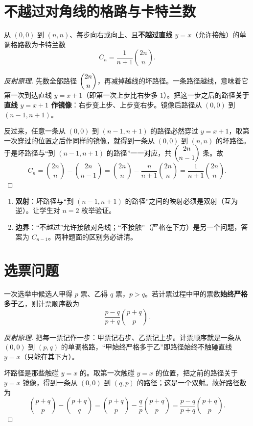 \section{不越过对角线的格路与卡特兰数}
\begin{theorem}[不越过对角线的格路]
从 $(0,0)$ 到 $(n,n)$、每步向右或向上、且\textbf{不越过直线 $y=x$}（允许接触）的单调格路数为卡特兰数
\[
C_n=\frac1{n+1}\binom{2n}{n}.
\]
\end{theorem}
\begin{proof}[反射原理]
先数全部路径 $\dbinom{2n}{n}$，再减掉越线的坏路径。一条路径越线，意味着它第一次到达直线 $y=x+1$（即第一次上步比右步多 $1$）。把这一步之后的路径\textbf{关于直线 $y=x+1$ 作镜像}：右步变上步、上步变右步。镜像后路径从 $(0,0)$ 到 $(n-1,n+1)$。

反过来，任意一条从 $(0,0)$ 到 $(n-1,n+1)$ 的路径必然穿过 $y=x+1$，取第一次穿过的位置之后作同样的镜像，就得到一条从 $(0,0)$ 到 $(n,n)$ 的坏路径。于是坏路径与“到 $(n-1,n+1)$ 的路径”一一对应，共 $\dbinom{2n}{n-1}$ 条。故
\[
C_n=\binom{2n}{n}-\binom{2n}{n-1}
=\binom{2n}{n}-\frac n{n+1}\binom{2n}{n}
=\frac1{n+1}\binom{2n}{n}.
\]
\end{proof}

\begin{teach}[反射原理的两步核对]
\begin{enumerate}
\item \textbf{双射}：坏路径与“到 $(n-1,n+1)$ 的路径”之间的映射必须是双射（互为逆）。让学生对 $n=2$ 枚举验证。
\item \textbf{边界}：“不越过”允许接触对角线；“不接触”（严格在下方）是另一个问题，答案为 $C_{n-1}$。两种题面的区别务必讲清。
\end{enumerate}
\end{teach}

\section{选票问题}
\begin{theorem}[选票问题]
一次选举中候选人甲得 $p$ 票、乙得 $q$ 票，$p>q$。若计票过程中甲的票数\textbf{始终严格多于}乙，则计票顺序数为
\[
\frac{p-q}{p+q}\binom{p+q}{p}.
\]
\end{theorem}
\begin{proof}[反射原理]
把每一票记作一步：甲票记右步、乙票记上步。计票顺序就是一条从 $(0,0)$ 到 $(p,q)$ 的单调格路，“甲始终严格多于乙”即路径始终不触碰直线 $y=x$（只能在其下方）。

坏路径是那些触碰 $y=x$ 的。取第一次触碰 $y=x$ 的位置，把之前的路径关于 $y=x$ 镜像，得到一条从 $(0,0)$ 到 $(q,p)$ 的路径；这是一个双射。故好路径数为
\[
\binom{p+q}{p}-\binom{p+q}{q}
=\binom{p+q}{p}-\frac{q}{p}\binom{p+q}{p}
=\frac{p-q}{p+q}\binom{p+q}{p}.
\]
\end{proof}

